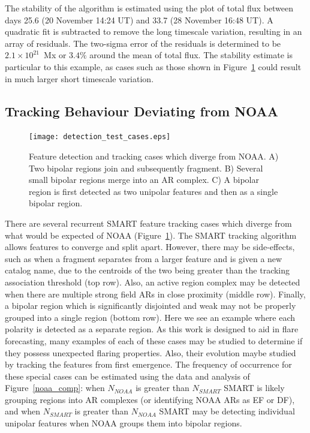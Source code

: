 The stability of the algorithm is estimated using the plot of total flux between days 25.6 (20 November 14:24 UT) and 33.7 (28 November 16:48 UT). A quadratic fit is subtracted to remove the long timescale variation, resulting in an array of residuals. The two-sigma error of the residuals is determined to be $2.1\times10^{21}$~Mx or $3.4\%$ around the mean of total flux. The stability estimate is particular to this example, as cases such as those shown in Figure~\ref{detectcases} could result in much larger short timescale variation.


\subsection{Tracking Behaviour Deviating from NOAA}\label{sect:nonnoaatrack}

\begin{figure}[!ht]
\begin{center}
\texttt{[image: detection\_test\_cases.eps]}
\end{center}
\caption{Feature detection and tracking cases which diverge from NOAA. A) Two bipolar regions join and subsequently fragment. B) Several small bipolar regions merge into an AR complex. C) A bipolar region is first detected as two unipolar features and then as a single bipolar region.}\label{detectcases}
\end{figure}

There are several recurrent \gls{SMART} feature tracking cases which diverge from what would be expected of \gls{NOAA} (Figure~\ref{detectcases}). The \gls{SMART} tracking algorithm allows features to converge and split apart. However, there may be side-effects, such as when a fragment separates from a larger feature and is given a new catalog name, due to the centroids of the two being greater than the tracking association threshold (top row). Also, an active region complex  may be detected when there are multiple strong field ARs in close proximity (middle row). Finally, a bipolar region which is significantly disjointed and weak may not be properly grouped into a single region (bottom row). Here we see an example where each polarity is detected as a separate region. As this work is designed to aid in flare forecasting, many examples of each of these cases may be studied to determine if they possess unexpected flaring properties. Also, their evolution maybe studied by tracking the features from first emergence. The frequency of occurrence for these special cases can be estimated using the data and analysis of Figure~\ref{noaa_comp}: when $N_{NOAA}$ is greater than $N_{SMART}$ \gls{SMART} is likely grouping regions into AR complexes (or identifying NOAA ARs as EF or DF), and when $N_{SMART}$ is greater than $N_{NOAA}$ \gls{SMART} may be detecting individual unipolar features when NOAA groups them into bipolar regions.


